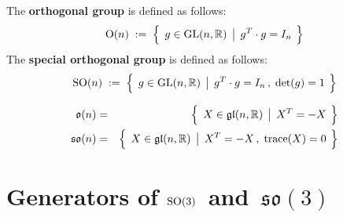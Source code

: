 
\vskip 0.5cm
\begin{definition}
\mbox{}
\vskip 0.1cm
\noindent
The \textbf{orthogonal group} is defined as follows:
\begin{equation*}
\textnormal{O}(n)
\; := \;
	\left\{\;\,
		g \overset{{\color{white}.}}{\in} \textnormal{GL}(n,\Re)
		\;\left\vert\;\,
			g^{T} \cdot g = I_{n}
			\right.
		\;\right\}
\end{equation*}
The \textbf{special orthogonal group} is defined as follows:
\begin{equation*}
\textnormal{SO}(n)
\; := \;
	\left\{\;\,
		g \overset{{\color{white}.}}{\in} \textnormal{GL}(n,\Re)
		\;\left\vert\;\,
			g^{T} \cdot g = I_{n}\,,
			\;
			\textnormal{det}(g) = 1
			\right.
		\;\right\}
\end{equation*}
\end{definition}


\begin{proposition}
\begin{eqnarray*}
\mathfrak{o}(n)
& = &
	\left\{\;\,
		X \overset{{\color{white}.}}{\in} \mathfrak{gl}(n,\Re)
		\;\left\vert\;\,
			X^{T} = -X
			\right.
		\;\right\}
\\
\mathfrak{so}(n)
& = &
	\left\{\;\,
		X \overset{{\color{white}.}}{\in} \mathfrak{gl}(n,\Re)
		\;\left\vert\;\,
			X^{T} = -X\,,
			\;
			\textnormal{trace}(X) = 0
			\right.
		\;\right\}
\end{eqnarray*}
\end{proposition}


\section{Generators of \;$\textnormal{SO}(3)$\, and \,$\mathfrak{so}(3)$}


